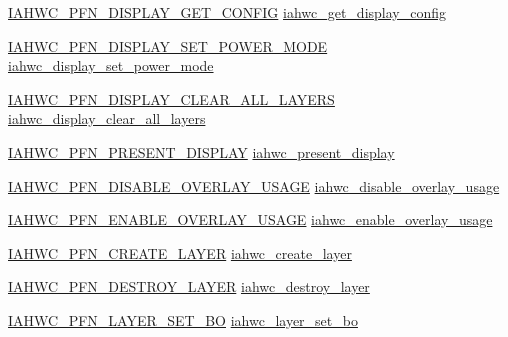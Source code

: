 \begin{DoxyCompactItemize}
\item 
\mbox{\hyperlink{iahwc_8h_a6038ea0f083ac033a6891bbcc4de917b}{I\+A\+H\+W\+C\+\_\+\+P\+F\+N\+\_\+\+D\+I\+S\+P\+L\+A\+Y\+\_\+\+G\+E\+T\+\_\+\+C\+O\+N\+F\+IG}} \mbox{\hyperlink{structiahwc__backend_af74cf4aa921a9fd29fa9af0b705e8dcb}{iahwc\+\_\+get\+\_\+display\+\_\+config}}
\item 
\mbox{\hyperlink{iahwc_8h_af6ed4d8004aabdfa73e634604204b186}{I\+A\+H\+W\+C\+\_\+\+P\+F\+N\+\_\+\+D\+I\+S\+P\+L\+A\+Y\+\_\+\+S\+E\+T\+\_\+\+P\+O\+W\+E\+R\+\_\+\+M\+O\+DE}} \mbox{\hyperlink{structiahwc__backend_adf78fcd106a4edfb0192d013f7401c6e}{iahwc\+\_\+display\+\_\+set\+\_\+power\+\_\+mode}}
\item 
\mbox{\hyperlink{iahwc_8h_aa17514d93b69c9a54c9d82ecf0d11a62}{I\+A\+H\+W\+C\+\_\+\+P\+F\+N\+\_\+\+D\+I\+S\+P\+L\+A\+Y\+\_\+\+C\+L\+E\+A\+R\+\_\+\+A\+L\+L\+\_\+\+L\+A\+Y\+E\+RS}} \mbox{\hyperlink{structiahwc__backend_a646d3bce546d9b5c350e72ae15e26873}{iahwc\+\_\+display\+\_\+clear\+\_\+all\+\_\+layers}}
\item 
\mbox{\hyperlink{iahwc_8h_a1415d2bd6d7268e5a19569bea1253d53}{I\+A\+H\+W\+C\+\_\+\+P\+F\+N\+\_\+\+P\+R\+E\+S\+E\+N\+T\+\_\+\+D\+I\+S\+P\+L\+AY}} \mbox{\hyperlink{structiahwc__backend_a88fa0cf8eac2b62782be05e11116658e}{iahwc\+\_\+present\+\_\+display}}
\item 
\mbox{\hyperlink{iahwc_8h_af4834e97f88b6d3621d46d3ae1886795}{I\+A\+H\+W\+C\+\_\+\+P\+F\+N\+\_\+\+D\+I\+S\+A\+B\+L\+E\+\_\+\+O\+V\+E\+R\+L\+A\+Y\+\_\+\+U\+S\+A\+GE}} \mbox{\hyperlink{structiahwc__backend_abaad0b59fa72161793343346912aaf0f}{iahwc\+\_\+disable\+\_\+overlay\+\_\+usage}}
\item 
\mbox{\hyperlink{iahwc_8h_a4cf034c28a745167ba7ca2c8a6440e6a}{I\+A\+H\+W\+C\+\_\+\+P\+F\+N\+\_\+\+E\+N\+A\+B\+L\+E\+\_\+\+O\+V\+E\+R\+L\+A\+Y\+\_\+\+U\+S\+A\+GE}} \mbox{\hyperlink{structiahwc__backend_acfdc89ce3877a820441c8268159bbf00}{iahwc\+\_\+enable\+\_\+overlay\+\_\+usage}}
\item 
\mbox{\hyperlink{iahwc_8h_ac4ba2d58145583caa8d4f483c38a9ca3}{I\+A\+H\+W\+C\+\_\+\+P\+F\+N\+\_\+\+C\+R\+E\+A\+T\+E\+\_\+\+L\+A\+Y\+ER}} \mbox{\hyperlink{structiahwc__backend_aa2c44d21d4005027a84fc589791ef7c0}{iahwc\+\_\+create\+\_\+layer}}
\item 
\mbox{\hyperlink{iahwc_8h_a258e5369457dcb3860d3ce84b35eaf2a}{I\+A\+H\+W\+C\+\_\+\+P\+F\+N\+\_\+\+D\+E\+S\+T\+R\+O\+Y\+\_\+\+L\+A\+Y\+ER}} \mbox{\hyperlink{structiahwc__backend_ada814727f58788eacd9410ab005b8f76}{iahwc\+\_\+destroy\+\_\+layer}}
\item 
\mbox{\hyperlink{iahwc_8h_a0b77b3ec5acd37ce148cf7e50edfc5cc}{I\+A\+H\+W\+C\+\_\+\+P\+F\+N\+\_\+\+L\+A\+Y\+E\+R\+\_\+\+S\+E\+T\+\_\+\+BO}} \mbox{\hyperlink{structiahwc__backend_ab926a60c3459282236e606c015eec784}{iahwc\+\_\+layer\+\_\+set\+\_\+bo}}

\end{DoxyCompactItemize}
